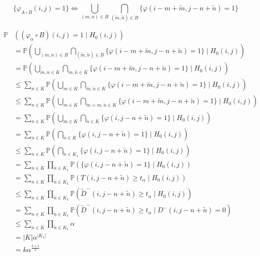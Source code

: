 \documentclass[a4paper,12pt]{article}
\newcommand{\abs}[1]{\lvert#1\rvert}
\theoremstyle{plain}
\theoremstyle{definition}
\theoremstyle{remark}
\begin{document}
\newpage



\begin{equation}
	\{ \varphi_{A \circ B}(i, j) = 1 \} \Leftrightarrow \bigcup_{(m, n) \in B} \bigcap_{(\tilde{m}, \tilde{n}) \in B} \{ \varphi(i - m + \tilde{m}, j - n + \tilde{n}) = 1 \}
\end{equation}

\begin{align*}
	\mathbb{P}&( (\varphi_\alpha \circ B)(i, j) = 1 \mid H_0(i, j) ) \\
	&= \mathbb{P}\left( \bigcup_{(m, n) \in B} \bigcap_{(\tilde{m}, \tilde{n}) \in B} \{ \varphi(i - m + \tilde{m}, j - n + \tilde{n}) = 1 \} \mid H_0(i, j) \right) \\
	&= \mathbb{P}\left( \bigcup_{m, n \in K} \bigcap_{\tilde{m}, \tilde{n} \in K} \{ \varphi(i - m + \tilde{m}, j - n + \tilde{n}) = 1 \} \mid H_0(i, j) \right) \\
	&\leq \sum_{n \in K} \mathbb{P}\left( \bigcup_{m \in K} \bigcap_{\tilde{m}, \tilde{n} \in K} \{ \varphi(i - m + \tilde{m}, j - n + \tilde{n}) = 1 \} \mid H_0(i, j) \right) \\
	&\leq \sum_{n \in K} \mathbb{P}\left( \bigcup_{m \in K} \bigcap_{\tilde{m} = m, \tilde{n} \in K} \{ \varphi(i - m + \tilde{m}, j - n + \tilde{n}) = 1 \} \mid H_0(i, j) \right) \\
	&= \sum_{n \in K} \mathbb{P}\left( \bigcup_{m \in K} \bigcap_{\tilde{n} \in K} \{ \varphi(i, j - n + \tilde{n}) = 1 \} \mid H_0(i, j) \right) \\
	&= \sum_{n \in K} \mathbb{P}\left( \bigcap_{\tilde{n} \in K} \{ \varphi(i, j - n + \tilde{n}) = 1 \} \mid H_0(i, j) \right) \\
	&\leq \sum_{n \in K} \mathbb{P}\left( \bigcap_{\tilde{n} \in K_1} \{ \varphi(i, j - n + \tilde{n}) = 1 \} \mid H_0(i, j) \right) \\
	&= \sum_{n \in K} \prod_{\tilde{n} \in K_1} \mathbb{P}( \{ \varphi(i, j - n + \tilde{n}) = 1 \} \mid H_0(i, j) ) \\
	&= \sum_{n \in K} \prod_{\tilde{n} \in K_1} \mathbb{P}( T(i, j - n + \tilde{n}) \geq t_\alpha \mid H_0(i, j) ) \\
	&\leq \sum_{n \in K} \prod_{\tilde{n} \in K_1} \mathbb{P}( \tilde{D}^-(i, j - n + \tilde{n}) \geq t_\alpha \mid H_0(i, j) ) \\
	&= \sum_{n \in K} \prod_{\tilde{n} \in K_1} \mathbb{P}( \tilde{D}^-(i, j - n + \tilde{n}) \geq t_\alpha \mid D^-(i, j - n + \tilde{n}) = 0 ) \\
	&\leq \sum_{n \in K} \prod_{\tilde{n} \in K_1} \alpha \\
	&= \abs{K} \alpha^{\abs{K_1}} \\
	&= k \alpha^{\frac{k+1}{2}}
\end{align*}
\end{document}
